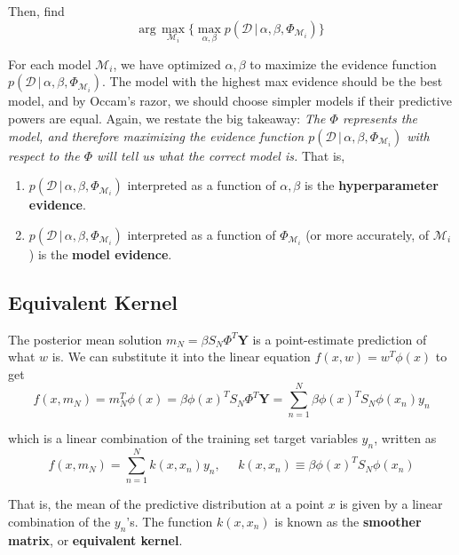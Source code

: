\documentclass{article}
\begin{document}
    Then, find
    \begin{equation}
      \text{arg}\, \max_{\mathcal{M}_i} \{ \max_{\alpha, \beta} p(\mathcal{D}\,|\,\alpha, \beta, \Phi_{\mathcal{M}_i}) \}
    \end{equation}

    For each model $\mathcal{M}_i$, we have optimized $\alpha, \beta$ to maximize the evidence function $p(\mathcal{D}\,|\,\alpha, \beta, \Phi_{\mathcal{M}_i})$. The model with the highest max evidence should be the best model, and by Occam's razor, we should choose simpler models if their predictive powers are equal. Again, we restate the big takeaway: \textit{The $\Phi$ represents the model, and therefore maximizing the evidence function $p(\mathcal{D}\,|\, \alpha, \beta, \Phi_{\mathcal{M}_i})$ with respect to the $\Phi$ will tell us what the correct model is.} That is,
    \begin{enumerate}
      \item $p(\mathcal{D}\,|\, \alpha, \beta, \Phi_{\mathcal{M}_i})$ interpreted as a function of $\alpha, \beta$ is the \textbf{hyperparameter evidence}.
      \item $p(\mathcal{D}\,|\, \alpha, \beta, \Phi_{\mathcal{M}_i})$ interpreted as a function of $\Phi_{\mathcal{M}_i}$ (or more accurately, of $\mathcal{M}_i$) is the \textbf{model evidence}.
    \end{enumerate}

  \subsection{Equivalent Kernel}

    The posterior mean solution $m_N = \beta S_N \Phi^T \mathbf{Y}$ is a point-estimate prediction of what $w$ is. We can substitute it into the linear equation $f(x, w) = w^T \phi(x)$ to get
    \begin{equation}
      f(x, m_N) = m_N^T \phi(x) = \beta \phi(x)^T S_N \Phi^T \mathbf{Y} = \sum_{n=1}^N \beta \phi(x)^T S_N \phi(x_n) y_n
    \end{equation}

    which is a linear combination of the training set target variables $y_n$, written as
    \begin{equation}
      f(x, m_N) = \sum_{n=1}^N k(x, x_n) y_n, \;\;\;\;\; k(x, x_n) \equiv \beta \phi(x)^T S_N \phi(x_n)
    \end{equation}

    That is, the mean of the predictive distribution at a point $x$ is given by a linear combination of the $y_n$'s. The function $k(x, x_n)$ is known as the \textbf{smoother matrix}, or \textbf{equivalent kernel}.





\end{document}
